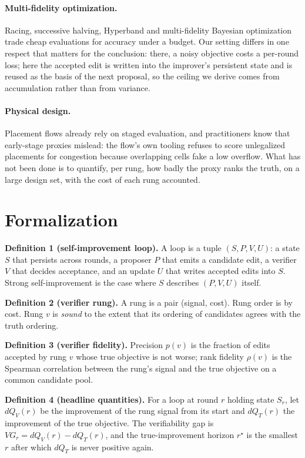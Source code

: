 \documentclass{article}
\begin{document}
\paragraph{Multi-fidelity optimization.} Racing, successive halving, Hyperband and
multi-fidelity Bayesian optimization trade cheap evaluations for accuracy under a
budget. Our setting differs in one respect that matters for the conclusion: there, a
noisy objective costs a per-round loss; here the accepted edit is written into the
improver's persistent state and is reused as the basis of the next proposal, so the
ceiling we derive comes from accumulation rather than from variance.

\paragraph{Physical design.} Placement flows already rely on staged evaluation, and
practitioners know that early-stage proxies mislead: the flow's own tooling refuses
to score unlegalized placements for congestion because overlapping cells fake a low
overflow. What has not been done is to quantify, per rung, how badly the proxy ranks
the truth, on a large design set, with the cost of each rung accounted.

\section{Formalization}
\label{sec:model}

\textbf{Definition 1 (self-improvement loop).} A loop is a tuple $(S,P,V,U)$: a state
$S$ that persists across rounds, a proposer $P$ that emits a candidate edit, a
verifier $V$ that decides acceptance, and an update $U$ that writes accepted edits into
$S$. Strong self-improvement is the case where $S$ describes $(P,V,U)$ itself.

\textbf{Definition 2 (verifier rung).} A rung is a pair (signal, cost). Rung order is
by cost. Rung $v$ is \emph{sound} to the extent that its ordering of candidates agrees
with the truth ordering.

\textbf{Definition 3 (verifier fidelity).} Precision $p(v)$ is the fraction of edits
accepted by rung $v$ whose true objective is not worse; rank fidelity $\rho(v)$ is the
Spearman correlation between the rung's signal and the true objective on a common
candidate pool.

\textbf{Definition 4 (headline quantities).} For a loop at round $r$ holding state
$S_r$, let $dQ_V(r)$ be the improvement of the rung signal from its start and
$dQ_T(r)$ the improvement of the true objective. The verifiability gap is
$VG_r = dQ_V(r) - dQ_T(r)$, and the true-improvement horizon $r^\star$ is the smallest
$r$ after which $dQ_T$ is never positive again.
\end{document}

